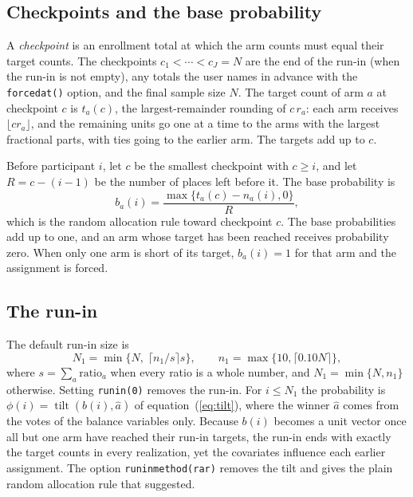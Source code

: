 \documentclass[bib]{statapress}
\begin{document}
\subsection{Checkpoints and the base probability}

A \emph{checkpoint} is an enrollment total at which the arm counts must equal
their target counts. The checkpoints $c_1 < \cdots < c_J = N$ are the end of the
run-in (when the run-in is not empty), any totals the user names in advance with
the \texttt{forcedat()} option, and the final sample size $N$. The target count
of arm $a$ at checkpoint $c$ is $t_a(c)$, the largest-remainder rounding of
$c \, r_a$: each arm receives $\lfloor c r_a \rfloor$, and the remaining units
go one at a time to the arms with the largest fractional parts, with ties going
to the earlier arm. The targets add up to $c$.

Before participant $i$, let $c$ be the smallest checkpoint with $c \ge i$, and
let $R = c - (i - 1)$ be the number of places left before it. The base
probability is
\begin{equation}
b_a(i) = \frac{\max\{t_a(c) - n_a(i), 0\}}{R},
\label{eq:base}
\end{equation}
which is the random allocation rule toward checkpoint $c$. The base
probabilities add up to one, and an arm whose target has been reached receives
probability zero. When only one arm is short of its target, $b_a(i) = 1$ for
that arm and the assignment is forced.

\subsection{The run-in}

The default run-in size is
\begin{equation}
N_1 = \min\{N, \; \lceil n_1 / s \rceil s\}, \qquad
n_1 = \max\{10, \lceil 0.10 N \rceil\},
\label{eq:runin}
\end{equation}
where $s = \sum_a \text{ratio}_a$ when every ratio is a whole number, and
$N_1 = \min\{N, n_1\}$ otherwise. Setting \texttt{runin(0)} removes the run-in.
For $i \le N_1$ the probability is $\phi(i) = \operatorname{tilt}(b(i), \hat a)$
of equation~(\ref{eq:tilt}), where the winner $\hat a$ comes from the votes of
the balance variables only. Because $b(i)$ becomes a unit vector once all but
one arm have reached their run-in targets, the run-in ends with exactly the
target counts in every realization, yet the covariates influence each earlier
assignment. The option \texttt{runinmethod(rar)} removes the tilt and gives the
plain random allocation rule that \citet{zhao2015msb} suggested.
\end{document}

